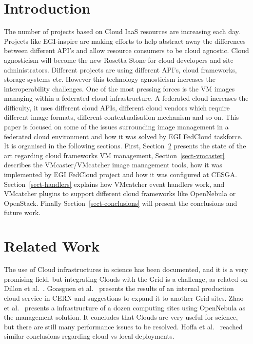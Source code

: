 \documentclass[oribibl]{llncs_Ibergrid2013}
\begin{document}
\section{Introduction}
\label{sect-introduction}
%
The number of projects based on Cloud IaaS resources are increasing each day. Projects like EGI-inspire are making efforts to help abstract away the differences between different API's and allow resource consumers to be cloud agnostic.
Cloud agnosticism will become the new Rosetta Stone for cloud developers and site administrators. Different projects are using different API's, cloud frameworks, storage systems etc. 
However this technology agnosticism increases the interoperability challenges. One of the most pressing forces is the VM images managing within a federated cloud infrastructure.
A federated cloud increases the difficulty, it uses different cloud APIs, different cloud vendors which require different image formats, different contextualisation mechanism and so on. 
This paper is focused on some of the issues surrounding image management in a federated cloud environment and how it was solved by EGI FedCloud taskforce.
It is organised in the following sections. First, Section~\ref{sect-relatedwork} presents the state of the art regarding cloud frameworks VM management, Section~\ref{sect-vmcaster} describes the VMcaster/VMcatcher image management tools, how it was implemented by EGI FedCloud project and how it was configured at CESGA. 
Section~\ref{sect-handlers} explains how VMcatcher event handlers work, and VMcatcher plugins to support different cloud frameworks like OpenNebula or OpenStack.
Finally Section~\ref{sect-conclusions} will present the conclusions and future work.  



\section{Related Work}
\label{sect-relatedwork}
The use of Cloud infrastructures in science has been documented, and it is a very promising field, but integrating Clouds with the Grid is a challenge, as related on Dillon et al.~\cite{Dillon2010}. Goasguen et al.~\cite{Goasguen2012} presents the results of an internal production cloud service in CERN and suggestions to expand it to another Grid sites. Zhao et al.~\cite{Zhao2012} presents a infrastructure of a dozen computing sites using OpenNebula as the management solution. It concludes that Clouds are very useful for science, but there are still many performance issues to be resolved. Hoffa et al.~\cite{Hoffa2008} reached similar conclusions regarding cloud vs local deployments.
\end{document}
